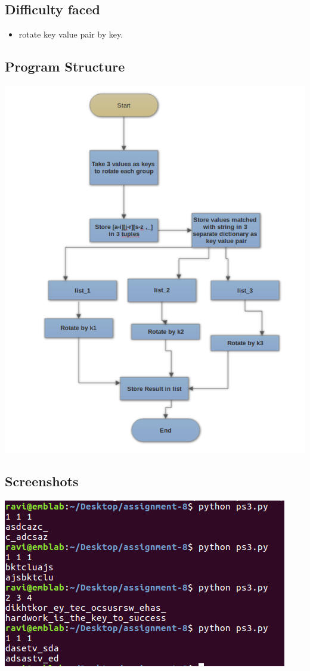 \documentclass[11pt]{article}
\begin{document}
{{\subsection{Difficulty faced}
{
\begin{itemize}
\item rotate key value pair by key.
\end{itemize}
}

\newpage
\subsection{Program Structure}
\begin{center}
\includegraphics[scale=0.60]{fc2.png}
\end{center}
\newpage

\subsection{Screenshots}
{
\begin{center}
\includegraphics[scale=0.70]{ss2.png}


\end{center}}}}
\end{document}
